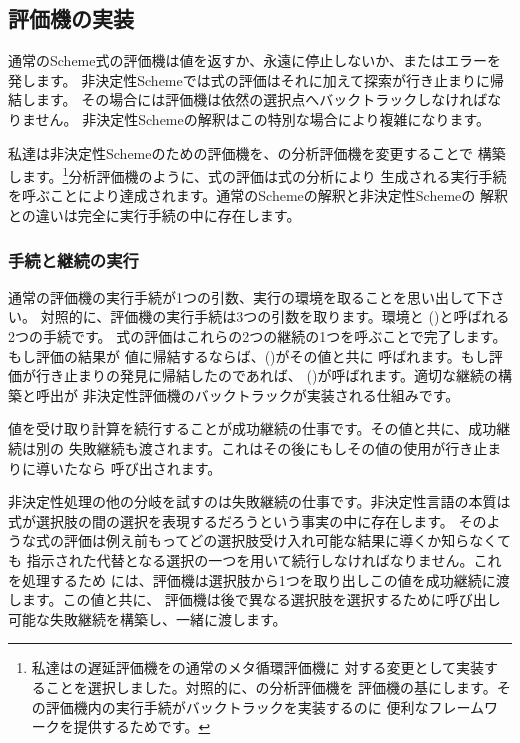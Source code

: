 \subsection{評価機の実装}
\label{Section 4.3.3}


通常のScheme式の評価機は値を返すか、永遠に停止しないか、またはエラーを発します。
非決定性Schemeでは式の評価はそれに加えて探索が行き止まりに帰結します。
その場合には評価機は依然の選択点へバックトラックしなければなりません。
非決定性Schemeの解釈はこの特別な場合により複雑になります。


私達は非決定性Schemeのための評価機を、の分析評価機を変更することで
構築します。\footnote{私達はの遅延評価機をの通常のメタ循環評価機に
対する変更として実装することを選択しました。対照的に、の分析評価機を
評価機の基にします。その評価機内の実行手続がバックトラックを実装するのに
便利なフレームワークを提供するためです。}分析評価機のように、式の評価は式の分析により
生成される実行手続を呼ぶことにより達成されます。通常のSchemeの解釈と非決定性Schemeの
解釈との違いは完全に実行手続の中に存在します。

\subsubsection*{手続と継続の実行}

通常の評価機の実行手続が1つの引数、実行の環境を取ることを思い出して下さい。
対照的に、評価機の実行手続は3つの引数を取ります。環境と
()と呼ばれる2つの手続です。
式の評価はこれらの2つの継続の1つを呼ぶことで完了します。もし評価の結果が
値に帰結するならば、()がその値と共に
呼ばれます。もし評価が行き止まりの発見に帰結したのであれば、
()が呼ばれます。適切な継続の構築と呼出が
非決定性評価機のバックトラックが実装される仕組みです。

値を受け取り計算を続行することが成功継続の仕事です。その値と共に、成功継続は別の
失敗継続も渡されます。これはその後にもしその値の使用が行き止まりに導いたなら
呼び出されます。


非決定性処理の他の分岐を試すのは失敗継続の仕事です。非決定性言語の本質は
式が選択肢の間の選択を表現するだろうという事実の中に存在します。
そのような式の評価は例え前もってどの選択肢受け入れ可能な結果に導くか知らなくても
指示された代替となる選択の一つを用いて続行しなければなりません。これを処理するため
には、評価機は選択肢から1つを取り出しこの値を成功継続に渡します。この値と共に、
評価機は後で異なる選択肢を選択するために呼び出し可能な失敗継続を構築し、一緒に渡します。


